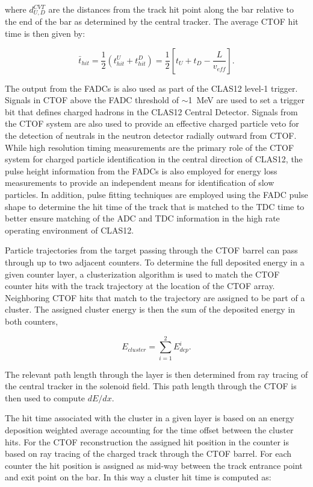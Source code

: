 \documentclass{elsart}
\begin{document}
\noindent
where $d^{CVT}_{U,D}$ are the distances from the track hit point along the bar relative to the end of the
bar as determined by the central tracker. The average CTOF hit time is then given by:

\begin{equation}
\bar{t}_{hit} = \frac{1}{2} ( t_{hit}^U + t_{hit}^D ) = \frac{1}{2} \left[ t_U + t_D - \frac{L}{v_{eff}} \right].
\end{equation}

The output from the FADCs is also used as part of the CLAS12 level-1 trigger. Signals in CTOF above
the FADC threshold of $\sim$1~MeV are used to set a trigger bit that defines charged hadrons in the
CLAS12 Central Detector. Signals from the CTOF system are also used to provide an effective charged
particle veto for the detection of neutrals in the neutron detector radially outward from CTOF. While high
resolution timing measurements are the primary role of the CTOF system for charged particle identification
in the central direction of CLAS12, the pulse height information from the FADCs is also employed for energy
loss measurements to provide an independent means for identification of slow particles. In addition, pulse
fitting techniques are employed using the FADC pulse shape to determine the hit time of the track that is
matched to the TDC time to better ensure matching of the ADC and TDC information in the high rate
operating environment of CLAS12.

Particle trajectories from the target passing through the CTOF barrel can pass through up to two adjacent
counters. To determine the full deposited energy in a given counter layer, a clusterization algorithm is used
to match the CTOF counter hits with the track trajectory at the location of the CTOF array. Neighboring
CTOF hits that match to the trajectory are assigned to be part of a cluster. The assigned cluster energy is
then the sum of the deposited energy in both counters,

\begin{equation}
\label{eclus}
E_{cluster} = \sum_{i=1}^{2} E_{dep}^i.
\end{equation}

\noindent
The relevant path length through the layer is then determined from ray tracing of the central tracker in
the solenoid field. This path length through the CTOF is then used to compute $dE/dx$.

The hit time associated with the cluster in a given layer is based on an energy deposition weighted average
accounting for the time offset between the cluster hits. For the CTOF reconstruction the assigned hit
position in the counter is based on ray tracing of the charged track through the CTOF barrel. For each counter
the hit position is assigned as mid-way between the track entrance point and exit point on the bar. In this way
a cluster hit time is computed as:
\end{document}
